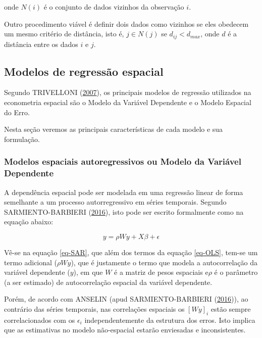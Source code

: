 \documentclass[12pt,]{article}
\begin{document}
onde \(N(i)\) é o conjunto de dados vizinhos da observação \(i\).

Outro procedimento viável é definir dois dados como vizinhos se eles
obedecem um mesmo critério de distância, isto é, \(j \in N(j)\) se
\(d_{ij} < d_{max}\), onde \(d\) é a distância entre os dados \(i\) e
\(j\).

\subsection{Modelos de regressão
espacial}\label{modelos-de-regressao-espacial}

Segundo TRIVELLONI (\protect\hyperlink{ref-trivelloni07}{2007}), os
principais modelos de regressão utilizados na econometria espacial são o
Modelo da Variável Dependente e o Modelo Espacial do Erro.

Nesta seção veremos as principais características de cada modelo e sua
formulação.

\subsubsection{Modelos espaciais autoregressivos ou Modelo da Variável
Dependente}\label{modelos-espaciais-autoregressivos-ou-modelo-da-variavel-dependente}

A dependência espacial pode ser modelada em uma regressão linear de
forma semelhante a um processo autorregressivo em séries temporais.
Segundo SARMIENTO-BARBIERI
(\protect\hyperlink{ref-sarmiento-barbieri}{2016}), isto pode ser
escrito formalmente como na equação abaixo:

\begin{equation}
  \label{eq-SAR}
  y = \rho Wy + X \beta + \epsilon
\end{equation}

Vê-se na equação \ref{eq-SAR}, que além dos termos da equação
\ref{eq-OLS}, tem-se um termo adicional (\(\rho Wy\)), que é justamente
o termo que modela a autocorrelação da variável dependente (\(y\)), em
que \(W\) é a matriz de pesos espaciais e\(\rho\) é o parâmetro (a ser
estimado) de autocorrelação espacial da variável dependente.

Porém, de acordo com ANSELIN (apud SARMIENTO-BARBIERI
(\protect\hyperlink{ref-sarmiento-barbieri}{2016})), ao contrário das
séries temporais, nas correlações espaciais os \([Wy]_i\) estão sempre
correlacionados com os \(\epsilon_i\) independentemente da estrutura dos
erros. Isto implica que as estimativas no modelo não-espacial estarão
enviesadas e inconsistentes.
\end{document}
